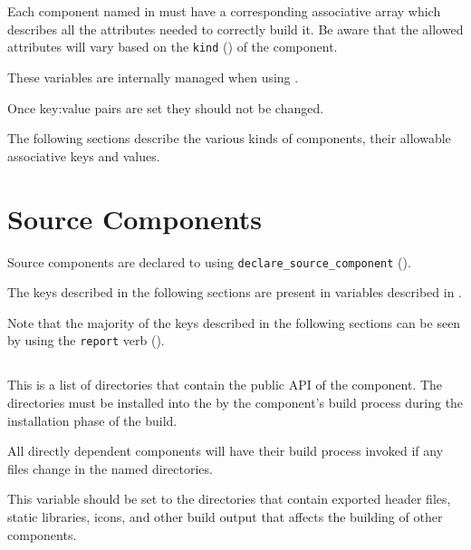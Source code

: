 \section{}\label{variables:lmsbw-component-component}

Each component named in \lmsbwcomponents must have a corresponding
associative array which describes all the attributes needed to
correctly build it.  Be aware that the allowed attributes will vary
based on the \texttt{kind} () of the component.

These variables are internally managed when using \lmsbw.

Once key:value pairs are set they should not be changed.

The following sections describe the various kinds of components, their
allowable associative keys and values.

\section{Source Components}

Source components are declared to \lmsbw using
\texttt{declare\_source\_component}
().

The keys described in the following sections are present in variables
described in .

Note that the majority of the keys described in the following sections
can be seen by using the \texttt{report} verb
().


\subsection{}\label{variables:api}

This is a list of directories that contain the public API of the
component.  The directories must be installed into the \destdir by the
component's build process during the installation phase of the build.

All directly dependent components will have their build process
invoked if any files change in the named directories.

This variable should be set to the directories that contain exported
header files, static libraries, icons, and other build output that
affects the building of other components.

